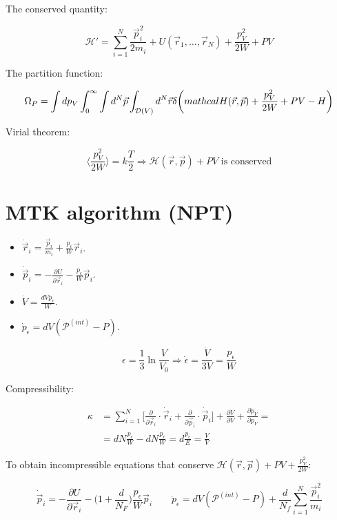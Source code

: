 	The conserved quantity:

	$$\mathcal{H}' = \sum\limits_{i=1}^N\frac{\vec{p}_i^2}{2m_i} + U(\vec{r}_1, \dots, \vec{r}_N) + \frac{p_V^2}{2W}+PV$$

	The partition function:

	$$\Omega_P = \int dp_V\int_0^{\infty}\int d^N\vec{p}\int_{\mathcal{D}(V)}d^N\vec{r}\delta\biggl(\\mathcal{H}(\vec{r},\vec{p}) + \frac{p_V^2}{2W}+PV-H\biggr)$$

	Virial theorem:

	$$\biggl\langle\frac{p_V^2}{2W}\biggr\rangle = k\frac{T}{2}\Rightarrow \mathcal{H}(\vec{r},\vec{p}) + PV\text{ is conserved}$$

\section{MTK algorithm (NPT)}

\begin{multicols}{2}
	\begin{itemize}
		\item $\dot{\vec{r}}_i = \frac{\vec{p}_i}{m_i} + \frac{p_\epsilon}{W}\vec{r}_i$.
		\item $\dot{\vec{p}}_i = -\frac{\partial U}{\partial\vec{r}_i} - \frac{p_\epsilon}{W}\vec{p}_i$.
		\item $\dot{V} = \frac{dVp_\epsilon}{W}$.
		\item $\dot{p}_\epsilon = dV(\mathcal{P}^{(int)}-P)$.
	\end{itemize}
\end{multicols}

$$\epsilon = \frac{1}{3}\ln\frac{V}{V_0}\Rightarrow\dot{\epsilon} = \frac{\dot{V}}{3V}=\frac{p_\epsilon}{W}$$

Compressibility:

\begin{align*}
	\kappa & = \sum\limits_{i=1}^N\biggl[\frac{\partial}{\partial\vec{r}_i}\cdot\dot{\vec{r}}_i + \frac{\partial}{\partial\vec{p}_i}\cdot\dot{\vec{p}}_i\biggr] + \frac{\partial\dot{V}}{\partial V} + \frac{\partial\dot{p}_V}{\partial p_V} = \\
				 &= dN\frac{p_\epsilon}{W}-dN\frac{p_\epsilon}{W} = d\frac{p_\epsilon}{E} = \frac{\dot{V}}{V}
\end{align*}

To obtain incompressible equations that conserve $\mathcal{H}(\vec{r},\vec{p}) + PV + \frac{p_V^2}{2W}$:

$$\dot{\vec{p}}_i = -\frac{\partial U}{\partial\vec{r}_i} - \biggl(1+\frac{d}{N_F}\biggr)\frac{p_\epsilon}{W}\vec{p}_i\qquad \dot{p}_\epsilon = dV(\mathcal{P}^{(int)}-P) + \frac{d}{N_f}\sum\limits_{i=1}^N\frac{\vec{p}_i^2}{m_i}$$

